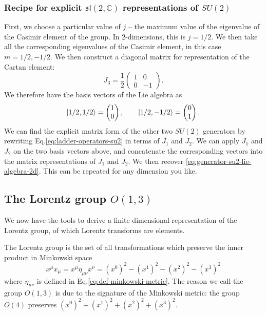 \documentclass[11pt]{article}
\numberwithin{equation}{section}
\begin{document}
\subsubsection{Recipe for explicit $\mathfrak{sl}(2, \mathbb{C})$ representations of $SU(2)$}

First, we choose a particular value of $j$ -- the maximum value of the eigenvalue of the Casimir element of the group. In 2-dimensions, this is $j=1/2$. We then take all the corresponding eigenvalues of the Casimir element, in this case $m=1/2, -1/2$. We then construct a diagonal matrix for representation of the Cartan element:
\begin{equation}
J_3 = \frac{1}{2}\begin{pmatrix}
1 & 0 \\
0 & -1
\end{pmatrix}.
\end{equation}
We therefore have the basis vectors of the Lie algebra as
\begin{equation}
\ket{1/2, 1/2} = \begin{pmatrix}
1 \\
0
\end{pmatrix}, \qquad \ket{1/2, -1/2} = \begin{pmatrix}
0 \\
1
\end{pmatrix}.
\end{equation}
We can find the explicit matrix form of the other two $SU(2)$ generators by rewriting Eq.\eqref{eq:ladder-operators-su2} in terms of $J_1$ and $J_2$. We can apply $J_1$ and $J_2$ on the two basis vectors above, and concatenate the corresponding vectors into the matrix representations of $J_1$ and $J_2$. We then recover \eqref{eq:generator-su2-lie-algebra-2d}. This can be repeated for any dimension you like.

\subsection{The Lorentz group $O(1,3)$}

We now have the tools to derive a finite-dimensional representation of the Lorentz group, of which Lorentz transforms are elements.

The Lorentz group is the set of all transformations which preserve the inner product in Minkowski space 
\begin{equation}
x^\mu x_\mu = x^\mu \eta_{\mu \nu} x^\nu = (x^0)^2 - (x^1)^2 - (x^2)^2 - (x^3)^2
\end{equation}
where $\eta_{\mu \nu}$ is defined in Eq.\eqref{eq:def-minkowski-metric}. The reason we call the group $O(1,3)$ is due to the signature of the Minkowski metric: the group $O(4)$ preserves $(x^0)^2 + (x^1)^2 + (x^2)^2 + (x^3)^2$. 
\end{document}
